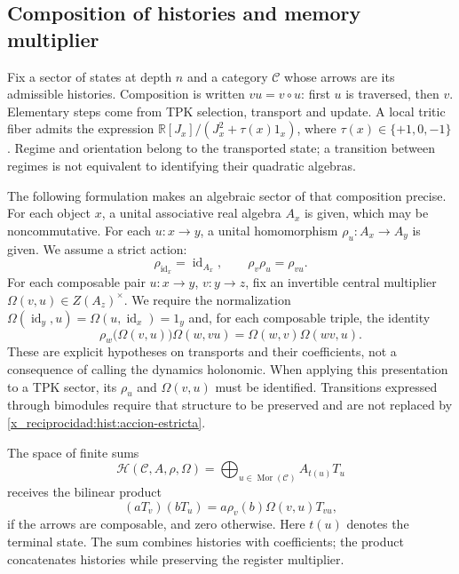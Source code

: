 \subsection{Composition of histories and memory multiplier}
\label{x_reciprocidad:hist:algebra}

Fix a sector of states at depth \(n\) and a category
\(\mathcal C\) whose arrows are its admissible histories. Composition
is written \(vu=v\circ u\): first \(u\) is traversed, then \(v\).
Elementary steps come from TPK selection, transport and
update. A local tritic fiber admits the expression
\(\mathbb R[J_x]/(J_x^2+\tau(x)1_x)\), where
\(\tau(x)\in\{+1,0,-1\}\). Regime and orientation belong to the
transported state; a transition between regimes is not equivalent to
identifying their quadratic algebras.

The following formulation makes an algebraic sector of that composition precise.
For each object \(x\), a unital associative real algebra \(A_x\) is given,
which may be noncommutative. For each \(u:x\to y\), a
unital homomorphism \(\rho_u:A_x\to A_y\) is given. We assume a strict action:
\begin{equation}
 \rho_{\operatorname{id}_x}=\operatorname{id}_{A_x},\qquad
 \rho_v\rho_u=\rho_{vu}.
 \label{x_reciprocidad:hist:accion-estricta}
\end{equation}
For each composable pair \(u:x\to y\), \(v:y\to z\), fix an
invertible central multiplier
\(\Omega(v,u)\in Z(A_z)^\times\). We require the normalization
\(\Omega(\operatorname{id}_y,u)=\Omega(u,\operatorname{id}_x)=1_y\)
and, for each composable triple, the identity
\begin{equation}
 \rho_w\bigl(\Omega(v,u)\bigr)\Omega(w,vu)
   =\Omega(w,v)\Omega(wv,u).
 \label{x_reciprocidad:hist:cociclo}
\end{equation}
These are explicit hypotheses on transports and their coefficients, not a
consequence of calling the dynamics holonomic. When applying this presentation
to a TPK sector, its \(\rho_u\) and \(\Omega(v,u)\) must be identified.
Transitions expressed through bimodules require that structure
to be preserved and are not replaced by \eqref{x_reciprocidad:hist:accion-estricta}.

The space of finite sums
\[
 \mathcal H(\mathcal C,A,\rho,\Omega)
   =\bigoplus_{u\in\operatorname{Mor}(\mathcal C)} A_{t(u)}T_u
\]
receives the bilinear product
\begin{equation}
 (aT_v)(bT_u)=a\rho_v(b)\Omega(v,u)T_{vu},
 \label{x_reciprocidad:hist:producto}
\end{equation}
if the arrows are composable, and zero otherwise. Here \(t(u)\)
denotes the terminal state. The sum combines histories with coefficients; the
product concatenates histories while preserving the register multiplier.

